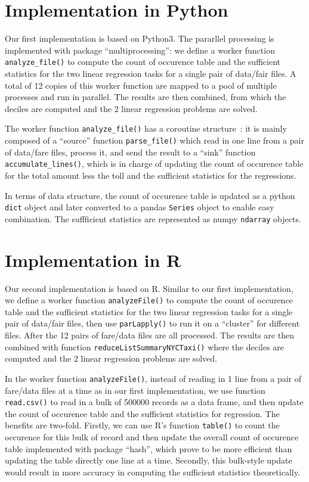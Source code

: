 \documentclass{article}
\begin{document}
\section{Implementation in Python}
Our first implementation is based on Python3. The pararllel processing is
implemented with package ``multiprocessing'': we define a worker function
\texttt{analyze\_file()} to compute the count of occurence table and the
sufficient statistics for the two linear regression tasks for a single pair of
data/fair files. A total of 12 copies of this worker function are mapped to a
pool of multiple processes and run in parallel. The results are then combined,
from which the deciles are computed and the 2 linear regression problems are
solved. 

The worker function \texttt{analyze\_file()} has a coroutine
structure~\cite{beazley2009curious}: it is mainly composed of a ``source''
function \texttt{parse\_file()} which read in one line from a pair of data/fare files,
process it, and send the result to a ``sink'' function
\texttt{accumulate\_lines()}, which is in charge of updating the count of
occurence table for the total amount less the toll and the sufficient statistics
for the regressions.

In terms of data structure, the count of occurence table is updated as a python
\texttt{dict} object and later converted to a pandas \texttt{Series} object to
enable easy combination. The suffficient statistics are represented as numpy
\texttt{ndarray} objects.

\section{Implementation in R}
Our second implementation is based on R. Similar to our first implementation,
we define a worker function \texttt{analyzeFile()} to compute the count of
occurence table and the sufficient statistics for the two linear regression
tasks for a single pair of data/fair files, then use \texttt{parLapply()} to run
it on a ``cluster'' for different files. After the 12 pairs of fare/data files
are all processed. The results are then combined with function
\texttt{reduceListSummaryNYCTaxi()} where the deciles are computed and the 2
linear regression problems are solved.

In the worker function \texttt{analyzeFile()}, instead of reading in 1 line from
a pair of fare/data files at a time as in our first implementation, we use
function \texttt{read.csv()} to read in a bulk of 500000 records as a data
frame, and then update the count of occurence table and the sufficient statistics for
regression. The benefits are two-fold. Firstly, we can use R's function
\texttt{table()} to count the occurence for this bulk of record and then update
the overall count of occurence table implemented with package ``hash'', which
prove to be more efficient than updating the table directly one line at a time.
Secondly, this bulk-style update would result in more accuracy in computing the
sufficient statistics theoretically.
\end{document}
